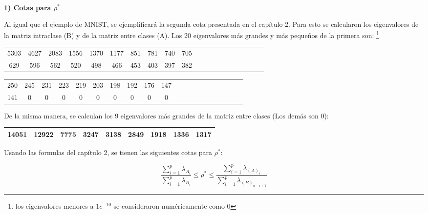 \underline{\textbf{1) Cotas para $\rho^*$}}

Al igual que el ejemplo de MNIST, se ejemplificará la segunda cota presentada en el capítulo 2. Para esto se calcularon los eigenvalores de la matriz intraclase (B) y de la matriz entre clases (A). Los 20 eigenvalores más grandes y más pequeños de la primera son: \footnote{los eigenvalores menores a $1e^{-10}$ se consideraron numéricamente como 0}

\begin{center}
\begin{tabular}{ | c | c|  c |c | c|  c |c | c|  c |c | c | c|  c |c | c|  c |c | c|  c |c |} 
\hline
5303 & 4627 & 2083 & 1556 & 1370 & 1177 & 851 & 781 & 740 & 705 \\
629 & 596 & 562 & 520 & 498 & 466 & 453 & 403 & 397 & 382 \\
\hline
\hline
\end{tabular}
\end{center}

\begin{center}
\begin{tabular}{ | c | c|  c |c | c|  c |c | c|  c |c | c | c|  c |c | c|  c |c | c|  c |c |} 
\hline
250 & 245 & 231 & 223 & 219 & 203 & 198 & 192 & 176 & 147 \\
141 & 0 & 0 & 0 & 0 & 0 & 0 & 0 & 0 & 0 \\
\hline
\hline
\end{tabular}
\end{center}

De la misma manera, se calculan los 9 eigenvalores más grandes de la matriz entre clases (Los demás son 0):

\begin{center}
\begin{tabular}{ | c | c|  c |c | c|  c |c | c|  c |} 
\hline
14051 & 12922 & 7775 & 3247 & 3138 & 2849 & 1918 & 1336 & 1317 \\
\hline
\hline
\end{tabular}
\end{center}

Usando las formulas del capítulo 2, se tienen las siguientes cotas para $\rho^*$:

\begin{equation*}
\frac{\sum_{i = 1}^{p}\lambda_{A_i}}{\sum_{i = 1}^{p}\lambda_{B_i}} \leq \rho^* \leq \frac{\sum_{i = 1}^{p}\lambda_{(A)_i}}{\sum_{i = 1}^{p}\lambda_{(B)_{n-i+1}}}  
\end{equation*}

